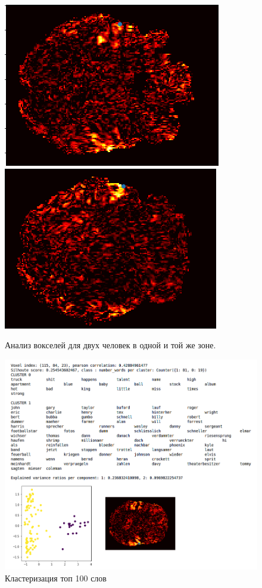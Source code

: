 \documentclass[pdftex,ptm,12pt,a4paper]{report}
\theoremstyle{definition}
\begin{document}
\begin{figure}
\centering
\includegraphics[scale=0.5]{images/voxel_to_choose1.png} 
\includegraphics[scale=0.5]{images/voxel_to_choose2.png} 
\caption{Анализ вокселей для двух человек в одной и той же зоне.}
\label{voxel_to_choose}
\end{figure}

\begin{figure}
\includegraphics[scale=0.55]{images/sub9_names.png}
\caption{Кластеризация топ 100 слов}
\label{sub9_names}
\end{figure}
\end{document}
